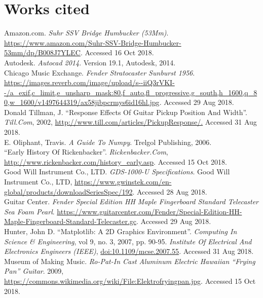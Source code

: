\documentclass{article}
\begin{document}
\section*{Works cited}
\begin{hangparas}{.25in}{1}

Amazon.com. \textit{Suhr SSV Bridge Humbucker (53Mm)}.
\url{https://www.amazon.com/Suhr-SSV-Bridge-Humbucker-53mm/dp/B008J7YLEC}.
Accessed 16 Oct 2018.\\

Autodesk. \textit{Autocad 2014}. Version 19.1, Autodesk, 2014.\\

Chicago Music Exchange. \textit{Fender Stratocaster Sunburst 1956}. \url{https://images.reverb.com/image/upload/s--iiQ3rVKI--/a_exif,c_limit,e_unsharp_mask:80,f_auto,fl_progressive,g_south,h_1600,q_80,w_1600/v1497644319/ax58jibpcrmys6id16hl.jpg}. Accessed 29 Aug 2018.\\

Donald Tillman, J. ``Response Effects Of Guitar Pickup Position And Width''.
\textit{Till.Com}, 2002, \url{http://www.till.com/articles/PickupResponse/.}
Accessed 31 Aug 2018.\\

E. Oliphant, Travis. \textit{A Guide To Numpy}. Trelgol Publishing, 2006.\\

``Early History Of Rickenbacker''. \textit{Rickenbacker.Com},
\url{http://www.rickenbacker.com/history_early.asp}. Accessed 15 Oct 2018. \\


Good Will Instrument Co., LTD. \textit{GDS-1000-U Specifications}. Good Will
Instrument Co., LTD,
\url{https://www.gwinstek.com/en-global/products/downloadSeriesSpec/192}.
Accessed 28 Aug 2018.\\
Guitar Center. \textit{Fender Special Edition HH Maple Fingerboard Standard
Telecaster Sea Foam Pearl}. \url{https://www.guitarcenter.com/Fender/Special-Edition-HH-Maple-Fingerboard-Standard-Telecaster.gc}. Accessed 29 Aug 2018.\\

Hunter, John D. ``Matplotlib: A 2D Graphics Environment''. \textit{Computing
In Science \& Engineering}, vol 9, no. 3, 2007, pp. 90-95. \textit{Institute
Of Electrical And Electronics Engineers (IEEE)},
\url{doi:10.1109/mcse.2007.55}. Accessed 31 Aug 2018.\\

Museum of Making Music. \textit{Ro-Pat-In Cast Aluminum Electric Hawaiian
``Frying Pan'' Guitar}. 2009,
\url{https://commons.wikimedia.org/wiki/File:Elektrofryingpan.jpg}. Accessed 15
Oct 2018. \\


\end{hangparas}
\end{document}

